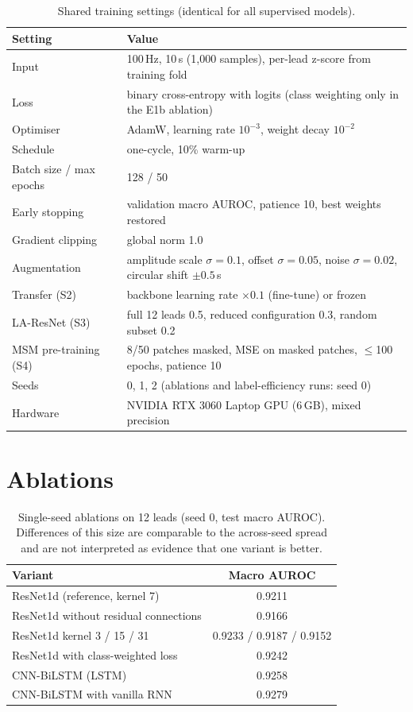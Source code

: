 \begin{table}[H]
\centering
\small
\caption{Shared training settings (identical for all supervised models).}
\begin{tabular}{ll}
\toprule
Setting & Value \\
\midrule
Input & 100\,Hz, 10\,s (1,000 samples), per-lead z-score from training fold \\
Loss & binary cross-entropy with logits (class weighting only in the E1b ablation) \\
Optimiser & AdamW, learning rate $10^{-3}$, weight decay $10^{-2}$ \\
Schedule & one-cycle, 10\% warm-up \\
Batch size / max epochs & 128 / 50 \\
Early stopping & validation macro AUROC, patience 10, best weights restored \\
Gradient clipping & global norm 1.0 \\
Augmentation & amplitude scale $\sigma=0.1$, offset $\sigma=0.05$, noise $\sigma=0.02$, circular shift $\pm0.5$\,s \\
Transfer (S2) & backbone learning rate $\times0.1$ (fine-tune) or frozen \\
LA-ResNet (S3) & full 12 leads 0.5, reduced configuration 0.3, random subset 0.2 \\
MSM pre-training (S4) & 8/50 patches masked, MSE on masked patches, $\leq$100 epochs, patience 10 \\
Seeds & 0, 1, 2 (ablations and label-efficiency runs: seed 0) \\
Hardware & NVIDIA RTX 3060 Laptop GPU (6\,GB), mixed precision \\
\bottomrule
\end{tabular}
\end{table}

\section{Ablations}
\label{app:ablation}

\begin{table}[H]
\centering
\small
\caption{Single-seed ablations on 12 leads (seed 0, test macro AUROC). Differences of this size are comparable to the across-seed spread and are not interpreted as evidence that one variant is better.}
\begin{tabular}{lc}
\toprule
Variant & Macro AUROC \\
\midrule
ResNet1d (reference, kernel 7) & 0.9211 \\
ResNet1d without residual connections & 0.9166 \\
ResNet1d kernel 3 / 15 / 31 & 0.9233 / 0.9187 / 0.9152 \\
ResNet1d with class-weighted loss & 0.9242 \\
CNN-BiLSTM (LSTM) & 0.9258 \\
CNN-BiLSTM with vanilla RNN & 0.9279 \\
\bottomrule
\end{tabular}
\end{table}

